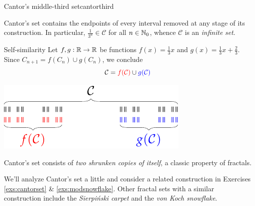 \begin{example}{Cantor's middle-third set}{cantorthird}
\begin{description}
		\item[Infinite Cardinality] Cantor's set contains the endpoints of every interval removed at any stage of its construction. In particular, $\frac 1{3^n}\in\mathcal C$ for all $n\in\mathbb{N}_0$, whence $\mathcal C$ is an \emph{infinite set}.\footnotemark
	
		\begin{minipage}[t]{0.6\linewidth}\vspace{-2pt}
		\item[Self-similarity] Let $f,g:\mathbb{R}\to\mathbb{R}$ be functions $f(x)=\frac 13 x$ and $g(x)=\frac 13x+\frac 23$. Since $C_{n+1}=f(C_n)\cup g(C_n)$, we conclude
		\[
			\mathcal C=\textcolor{red}{f(\mathcal C)}
			\cup \textcolor{blue}{g(\mathcal C)}
		\]
		\end{minipage}
		\hfill
		\begin{minipage}[t]{0.39\linewidth}\vspace{-4pt}
			\hfill\includegraphics{setsii-09-cantorselfsim}
		\end{minipage}
		\smallbreak
		
		Cantor's set consists of \emph{two shrunken copies of itself}, a classic property of fractals.
	\end{description}

\end{example}


We'll analyze Cantor's set a little and consider a related construction in Exercises \ref{exs:cantorset} \& \ref{exs:modsnowflake}. Other fractal sets with a similar construction include the \emph{Sierpiński carpet} and the \emph{von Koch snowflake}.



